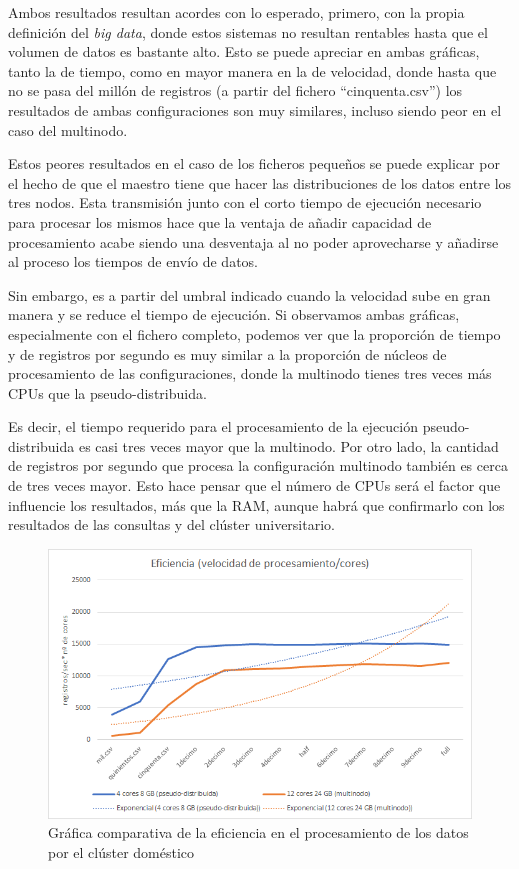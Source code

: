 Ambos resultados resultan acordes con lo esperado, primero, con la propia definición del \textit{big data}, donde estos sistemas no resultan rentables hasta que el volumen de datos es bastante alto. Esto se puede apreciar en ambas gráficas, tanto la de tiempo, como en mayor manera en la de velocidad, donde hasta que no se pasa del millón de registros (a partir del fichero ``cinquenta.csv'') los resultados de ambas configuraciones son muy similares, incluso siendo peor en el caso del multinodo. 

Estos peores resultados en el caso de los ficheros pequeños se puede explicar por el hecho de que el maestro tiene que hacer las distribuciones de los datos entre los tres nodos. Esta transmisión junto con el corto tiempo de ejecución necesario para procesar los mismos hace que la ventaja de añadir capacidad de procesamiento acabe siendo una desventaja al no poder aprovecharse y añadirse al proceso los tiempos de envío de datos.

Sin embargo, es a partir del umbral indicado cuando la velocidad sube en gran manera y se reduce el tiempo de ejecución. Si observamos ambas gráficas, especialmente con el fichero completo, podemos ver que la proporción de tiempo y de registros por segundo es muy similar a la proporción de núcleos de procesamiento de las configuraciones, donde la multinodo tienes tres veces más \gls{CPU}s que la pseudo-distribuida.

Es decir, el tiempo requerido para el procesamiento de la ejecución pseudo-distribuida es casi tres veces mayor que la multinodo. Por otro lado, la cantidad de registros por segundo que procesa la configuración multinodo también es cerca de tres veces mayor. Esto hace pensar que el número de \gls{CPU}s será el factor que influencie los resultados, más que la \gls{RAM}, aunque habrá que confirmarlo con los resultados de las consultas y del clúster universitario.

\begin{figure}[htp!]
	\centering
	\caption{Gráfica comparativa de la eficiencia en el procesamiento de los datos por el clúster doméstico}
	\label{gra:efiProcDom}
	\vspace{5pt}
	\includegraphics[scale=0.85]{graficas/epdom}
\end{figure}

